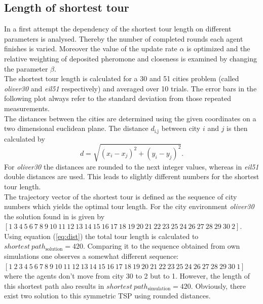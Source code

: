 

\subsection{Length of shortest tour}

In a first attempt the dependency of the shortest tour length on different parameters is analysed. Thereby the number of completed rounds each agent finishes is varied. Moreover the value of the update rate $\alpha$ is optimized and the relative weighting of deposited pheromone and closeness is examined by changing the parameter $\beta$. \\

The shortest tour length is calculated for a 30 and 51 cities problem (called \emph{oliver30} and \emph{eil51} respectively) and averaged over 10 trials. The error bars in the following plot always refer to the standard deviation from those repeated measurements.\\The distances between the cities are determined using the given coordinates on a two dimensional euclidean plane. The distance $d_\text{i,j}$ between city $i$ and $j$ is then calculated by
\begin{equation}
d = \sqrt{(x_i-x_j)^2+(y_i-y_j)^2}.
\label{eq:dist}
\end{equation}
For \emph{oliver30} the distances are rounded to the next integer values, whereas in \emph{eil51} double distances are used. This leads to slightly different numbers for the shortest tour length.\\

The trajectory vector of the shortest tour is defined as the sequence of city numbers which yields the optimal tour length. For the city environment \emph{oliver30} the solution found in \cite{oli} is given by $[1~3~  4~  5~  6~  7~  8~  9~  10~  11~  12~  13~  14~  15~  16~  17~  18~  19~  20~  21~  22~  23~  25~  24~  26~  27~  28~  29~  30~  2]$. Using equation (\ref{eq:dist}) the total tour length is calculated to $shortest~path_\text{solution} = 420$. Comparing it to the sequence obtained from own simulations one observes a somewhat different sequence: $[1~2 ~3~  4~  5~  6~  7~  8~  9~  10~  11~  12~  13~  14~  15~  16~  17~  18~  19~  20~  21~  22~  23~  25~  24~  26~  27~  28~  29~  30~  1]$ where the agents don't move from city 30 to 2 but to 1. However, the length of this shortest path also results in $shortest~ path_\text{simulation}=420$. Obviously, there exist two solution to this symmetric TSP using rounded distances.\\

